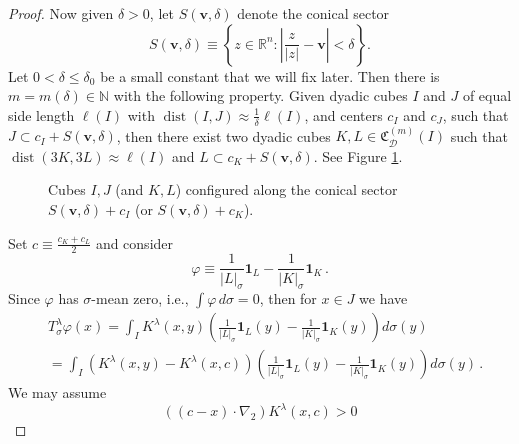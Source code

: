 \documentclass{amsart}%
\theoremstyle{plain}
\numberwithin{equation}{section}
\begin{document}
\begin{proof}
Now given $\delta>0$, let $S\left(  \mathbf{v},\delta\right)  $ denote the
conical sector
\[
S\left(  \mathbf{v},\delta\right)  \equiv\left\{  z\in\mathbb{R}%
^{n}:\left\vert \frac{z}{\left\vert z\right\vert }-\mathbf{v}\right\vert
<\delta\right\}  \text{.}%
\]
Let $0<\delta\leq\delta_{0}$ be a small constant that we will fix later. Then
there is $m=m(\delta)\in\mathbb{N}$ with the following property. Given dyadic
cubes $I$ and $J$ of equal side length $\ell\left(  I\right)  $ with
$\operatorname*{dist}\left(  I,J\right)  \approx\frac{1}{\delta}\ell\left(
I\right)  $, and centers $c_{I}$ and $c_{J}$, such that $J\subset
c_{I}+S\left(  \mathbf{v},\delta\right)  $, then there exist two dyadic cubes
$K,L\in\mathfrak{C}_{\mathcal{D}}^{\left(  m\right)  }\left(  I\right)  $ such
that $\operatorname*{dist}\left(  3K,3L\right)  \approx\ell\left(  I\right)  $
and $L\subset c_{K}+S\left(  \mathbf{v},\delta\right)  $. See Figure
\ref{cubes}.%
\begin{figure}[ht] 
	\caption{Cubes $I, J$ (and $K,L$) configured along the conical sector $S(\mathbf{v}, \delta) + c_I$ (or $S(\mathbf{v}, \delta) + c_K$). }
\label{cubes}
\end{figure}
Set $c\equiv\frac{c_{K}+c_{L}}{2}$ and consider
\begin{equation}
\varphi\equiv\frac{1}{\left\vert L\right\vert _{\sigma}}\mathbf{1}_{L}%
-\frac{1}{\left\vert K\right\vert _{\sigma}}\mathbf{1}_{K} \, .\label{def phi}
\end{equation}
Since $\varphi$ has $\sigma$-mean zero, i.e., $\int\varphi\,d\sigma=0$, then for $x\in J$ we have%
\begin{align}
&  T_{\sigma}^{\lambda}\varphi\left(  x\right)  =\int_{I}K^{\lambda}\left(
x,y\right)  \left(  \frac{1}{\left\vert L\right\vert _{\sigma}}\mathbf{1}%
_{L}\left(  y\right)  -\frac{1}{\left\vert K\right\vert _{\sigma}}%
\mathbf{1}_{K}\left(  y\right)  \right)  d\sigma\left(  y\right)
\label{T phi pointwise}\\
&  =\int_{I}\left(  K^{\lambda}\left(  x,y\right)  -K^{\lambda}\left(
x,c\right)  \right)  \left(  \frac{1}{\left\vert L\right\vert _{\sigma}%
}\mathbf{1}_{L}\left(  y\right)  -\frac{1}{\left\vert K\right\vert _{\sigma}%
}\mathbf{1}_{K}\left(  y\right)  \right)  d\sigma\left(  y\right)  \, .\nonumber
\end{align}
We may assume
\begin{equation}
\label{eq:assumption}\left(  \left(  c-x \right)  \cdot\nabla_{2}\right)
K^{\lambda}\left(  x,c\right)  >0

\end{equation}
\end{proof}
\end{document}
